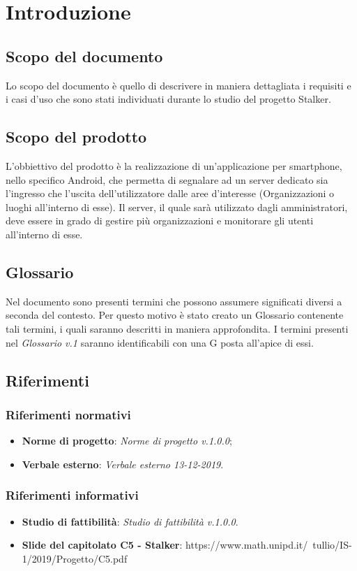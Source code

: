 \section{Introduzione}
\subsection{Scopo del documento}
Lo scopo del documento è quello di descrivere in maniera dettagliata i requisiti e i casi d'uso che sono stati individuati durante lo studio del progetto Stalker.
\subsection{Scopo del prodotto}
L'obbiettivo del prodotto è la realizzazione di un'applicazione per smartphone, nello specifico Android, che permetta di segnalare ad un server dedicato sia l'ingresso che l'uscita dell'utilizzatore dalle aree d'interesse (Organizzazioni o luoghi all'interno di esse).
Il server, il quale sarà utilizzato dagli amministratori, deve essere in grado di gestire più organizzazioni e monitorare gli utenti all'interno di esse.
\subsection{Glossario}
Nel documento sono presenti termini che possono assumere significati diversi a seconda del contesto. Per questo motivo è stato creato un Glossario contenente tali termini, i quali saranno descritti in maniera approfondita. I termini presenti nel \textit{Glossario v.1} saranno identificabili con una G posta all'apice di essi.

\subsection{Riferimenti}


\subsubsection{Riferimenti normativi}
\begin{itemize}
\item \textbf{Norme di progetto}: \textit{Norme di progetto v.1.0.0};
\item \textbf{Verbale esterno}: \textit{Verbale esterno 13-12-2019}.
\end{itemize}

\subsubsection{Riferimenti informativi}
\begin{itemize}
\item \textbf{Studio di fattibilità}: \textit{Studio di fattibilità v.1.0.0}.
\item \textbf{Slide del capitolato C5 - Stalker}: https://www.math.unipd.it/~tullio/IS-1/2019/Progetto/C5.pdf
\end{itemize}
